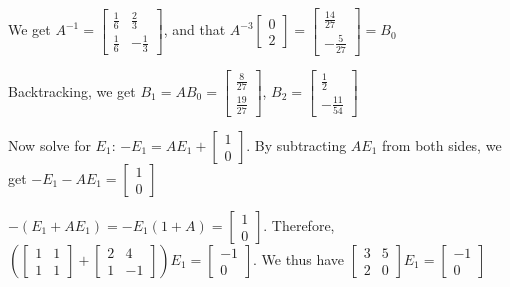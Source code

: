 \documentclass{article}
\begin{document}
\noindent We get $A^{-1} = \begin{bmatrix}
    \frac{1}{6} & \frac{2}{3}\\
    \frac{1}{6} & -\frac{1}{3}
\end{bmatrix}$, and that $A^{-3}\begin{bmatrix}
    0\\
    2
\end{bmatrix} = \begin{bmatrix}
    \frac{14}{27}\\
    -\frac{5}{27}
\end{bmatrix} = B_{0}$ \par

\noindent Backtracking, we get $B_{1} = AB_{0} = \begin{bmatrix}
    \frac{8}{27} \\
    \frac{19}{27}
\end{bmatrix}$, $B_{2} = \begin{bmatrix}
    \frac{1}{2}\\
    -\frac{11}{54}
\end{bmatrix}$ \par
    
\noindent Now solve for $E_{1}$: $-E_{1} = AE_{1} + \begin{bmatrix}
    1\\
    0
\end{bmatrix}$.  By subtracting $AE_{1}$ from both sides, we get $-E_{1} - AE_{1} = \begin{bmatrix}
    1\\
    0
\end{bmatrix}$ \par

\noindent $-(E_{1} + AE_{1}) = -E_{1}(1 + A) = \begin{bmatrix}
    1\\
    0
\end{bmatrix}$.  Therefore, $(\begin{bmatrix}
    1 & 1\\
    1 & 1
\end{bmatrix} + \begin{bmatrix}
    2 & 4 \\
    1 & -1
\end{bmatrix})E_{1} = \begin{bmatrix}
    -1\\
    0
\end{bmatrix}$.  We thus have $\begin{bmatrix}
    3 & 5\\
    2 & 0
\end{bmatrix}E_{1} = \begin{bmatrix}
    -1\\
    0
\end{bmatrix}$ \par
\end{document}
